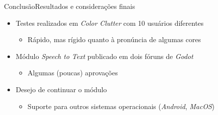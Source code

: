 \begin{frame}{Conclusão}{Resultados e considerações finais}

\begin{itemize}
\item Testes realizados em \textit{Color Clutter} com 10 usuários diferentes
\begin{itemize}
    \item<2-> Rápido, mas rígido quanto à pronúncia de algumas cores
\end{itemize}

\item<3-> Módulo \textit{Speech to Text} publicado em dois fóruns de \textit{Godot}
\begin{itemize}
  \item Algumas (poucas) aprovações
\end{itemize}

\item<4-> Desejo de continuar o módulo
\begin{itemize}
\item Suporte para outros sistemas operacionais (\textit{Android}, \textit{MacOS})
\end{itemize}

\end{itemize}
\end{frame}
